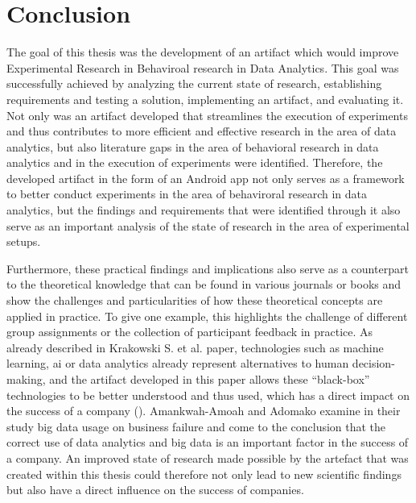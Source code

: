 \section{Conclusion}


The goal of this thesis was the development of an artifact which would improve Experimental Research in Behaviroal research in Data Analytics. This goal was successfully achieved by analyzing the current state of research, establishing requirements and testing a solution, implementing an artifact, and evaluating it. Not only was an artifact developed that streamlines the execution of experiments and thus contributes to more efficient and effective research in the area of data analytics, but also literature gaps in the area of behavioral research in data analytics and in the execution of experiments were identified. Therefore, the developed artifact in the form of an Android app not only serves as a framework to better conduct experiments in the area of behaviroral research in data analytics, but the findings and requirements that were identified through it also serve as an important analysis of the state of research in the area of experimental setups.

Furthermore, these practical findings and implications also serve as a counterpart to the theoretical knowledge that can be found in various journals or books and show the challenges and particularities of how these theoretical concepts are applied in practice. To give one example, this highlights the challenge of different group assignments or the collection of participant feedback in practice. As already described in Krakowski S. et al. paper, technologies such as machine learning, \ac{ai} or data analytics already represent alternatives to human decision-making, and the artifact developed in this paper allows these \enquote{black-box} technologies to be better understood and thus used, which has a direct impact on the success of a company (\cite{Krakowski.2023}). Amankwah-Amoah and Adomako examine in their study big data usage on business failure and come to the conclusion that the correct use of data analytics and big data is an important factor in the success of a company. An improved state of research made possible by the artefact that was created within this thesis could therefore not only lead to new scientific findings but also have a direct influence on the success of companies.

